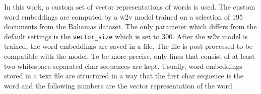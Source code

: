 In this work, a custom set of vector representations of words is used.
The custom word embeddings are computed by a \ac{w2v} model trained on a selection of 195 documents from the Bahamas dataset.
The only parameter which differs from the default settings is the \texttt{vector\_size} which is set to 300.
After the \ac{w2v} model is trained, the word embeddings are saved in a file.
The file is post-processed to be compatible with the \infersent{} model.
To be more precise, only lines that consist of at least two whitespace-separated char sequences are kept.
Usually, word embeddings stored in a text file are structured in a way that 
the first char sequence is the word and the following numbers are the vector representation of the word.
